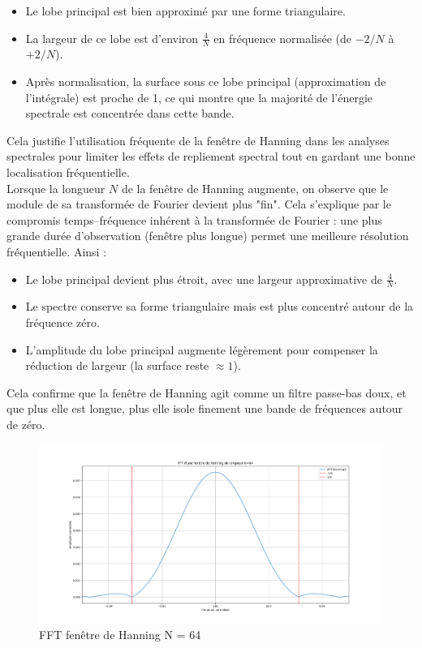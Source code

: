 \begin{itemize}
    \item Le lobe principal est bien approximé par une forme triangulaire.
    \item La largeur de ce lobe est d’environ $\frac{4}{N}$ en fréquence normalisée (de $-2/N$ à $+2/N$).
    \item Après normalisation, la surface sous ce lobe principal (approximation de l’intégrale) est proche de 1, ce qui montre que la majorité de l’énergie spectrale est concentrée dans cette bande.
\end{itemize}

Cela justifie l’utilisation fréquente de la fenêtre de Hanning dans les analyses spectrales pour limiter les effets de repliement spectral tout en gardant une bonne localisation fréquentielle.\\

Lorsque la longueur $N$ de la fenêtre de Hanning augmente, on observe que le module de sa transformée de Fourier devient plus "fin". Cela s’explique par le compromis temps–fréquence inhérent à la transformée de Fourier : une plus grande durée d’observation (fenêtre plus longue) permet une meilleure résolution fréquentielle. Ainsi :

\begin{itemize}
    \item Le lobe principal devient plus étroit, avec une largeur approximative de $\frac{4}{N}$.
    \item Le spectre conserve sa forme triangulaire mais est plus concentré autour de la fréquence zéro.
    \item L’amplitude du lobe principal augmente légèrement pour compenser la réduction de largeur (la surface reste $\approx 1$).
\end{itemize}

Cela confirme que la fenêtre de Hanning agit comme un filtre passe-bas doux, et que plus elle est longue, plus elle isole finement une bande de fréquences autour de zéro.

\begin{figure}[h!]
    \centering
    \includegraphics[width=18cm]{screenshots/triangle_hanning.png}
    \caption{FFT fenêtre de Hanning N = 64}
\end{figure}

